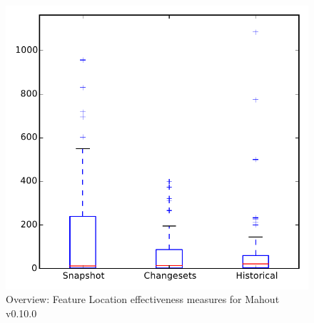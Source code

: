 
\begin{figure}
\centering
\includegraphics[height=0.4\textheight]{figures/flt/all_mahout}
\caption{Overview: Feature Location effectiveness measures for Mahout v0.10.0}
\label{fig:flt:all:mahout}
\end{figure}

